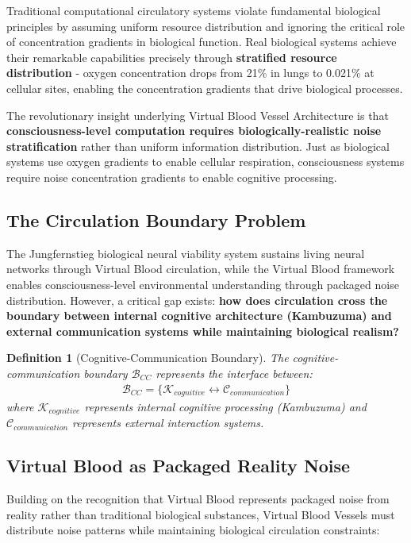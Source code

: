 \documentclass[12pt,a4paper]{article}
\newtheorem{definition}{Definition}
\begin{document}
Traditional computational circulatory systems violate fundamental biological principles by assuming uniform resource distribution and ignoring the critical role of concentration gradients in biological function. Real biological systems achieve their remarkable capabilities precisely through \textbf{stratified resource distribution} - oxygen concentration drops from 21\% in lungs to 0.021\% at cellular sites, enabling the concentration gradients that drive biological processes.

The revolutionary insight underlying Virtual Blood Vessel Architecture is that \textbf{consciousness-level computation requires biologically-realistic noise stratification} rather than uniform information distribution. Just as biological systems use oxygen gradients to enable cellular respiration, consciousness systems require noise concentration gradients to enable cognitive processing.

\subsection{The Circulation Boundary Problem}

The Jungfernstieg biological neural viability system sustains living neural networks through Virtual Blood circulation, while the Virtual Blood framework enables consciousness-level environmental understanding through packaged noise distribution. However, a critical gap exists: \textbf{how does circulation cross the boundary between internal cognitive architecture (Kambuzuma) and external communication systems while maintaining biological realism?}

\begin{definition}[Cognitive-Communication Boundary]
The cognitive-communication boundary $\mathcal{B}_{CC}$ represents the interface between:
\begin{align}
\mathcal{B}_{CC} = \{\mathcal{K}_{cognitive} \leftrightarrow \mathcal{C}_{communication}\}
\end{align}
where $\mathcal{K}_{cognitive}$ represents internal cognitive processing (Kambuzuma) and $\mathcal{C}_{communication}$ represents external interaction systems.
\end{definition}

\subsection{Virtual Blood as Packaged Reality Noise}

Building on the recognition that Virtual Blood represents packaged noise from reality rather than traditional biological substances, Virtual Blood Vessels must distribute noise patterns while maintaining biological circulation constraints:
\end{document}
